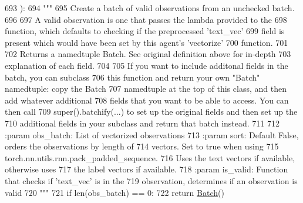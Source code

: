 \begin{DoxyCode}
693     ):
694         \textcolor{stringliteral}{"""}
695 \textcolor{stringliteral}{        Create a batch of valid observations from an unchecked batch.}
696 \textcolor{stringliteral}{}
697 \textcolor{stringliteral}{        A valid observation is one that passes the lambda provided to the}
698 \textcolor{stringliteral}{        function, which defaults to checking if the preprocessed 'text\_vec'}
699 \textcolor{stringliteral}{        field is present which would have been set by this agent's 'vectorize'}
700 \textcolor{stringliteral}{        function.}
701 \textcolor{stringliteral}{}
702 \textcolor{stringliteral}{        Returns a namedtuple Batch. See original definition above for in-depth}
703 \textcolor{stringliteral}{        explanation of each field.}
704 \textcolor{stringliteral}{}
705 \textcolor{stringliteral}{        If you want to include additonal fields in the batch, you can subclass}
706 \textcolor{stringliteral}{        this function and return your own "Batch" namedtuple: copy the Batch}
707 \textcolor{stringliteral}{        namedtuple at the top of this class, and then add whatever additional}
708 \textcolor{stringliteral}{        fields that you want to be able to access. You can then call}
709 \textcolor{stringliteral}{        super().batchify(...) to set up the original fields and then set up the}
710 \textcolor{stringliteral}{        additional fields in your subclass and return that batch instead.}
711 \textcolor{stringliteral}{}
712 \textcolor{stringliteral}{        :param obs\_batch: List of vectorized observations}
713 \textcolor{stringliteral}{        :param sort:      Default False, orders the observations by length of}
714 \textcolor{stringliteral}{                          vectors. Set to true when using}
715 \textcolor{stringliteral}{                          torch.nn.utils.rnn.pack\_padded\_sequence.}
716 \textcolor{stringliteral}{                          Uses the text vectors if available, otherwise uses}
717 \textcolor{stringliteral}{                          the label vectors if available.}
718 \textcolor{stringliteral}{        :param is\_valid:  Function that checks if 'text\_vec' is in the}
719 \textcolor{stringliteral}{                          observation, determines if an observation is valid}
720 \textcolor{stringliteral}{        """}
721         \textcolor{keywordflow}{if} len(obs\_batch) == 0:
722             \textcolor{keywordflow}{return} \hyperlink{namespaceparlai_1_1agents_1_1legacy__agents_1_1seq2seq_1_1torch__agent__v1_a74cfde390a2b9861179ac0fcd59da28c}{Batch}()

\end{DoxyCode}
